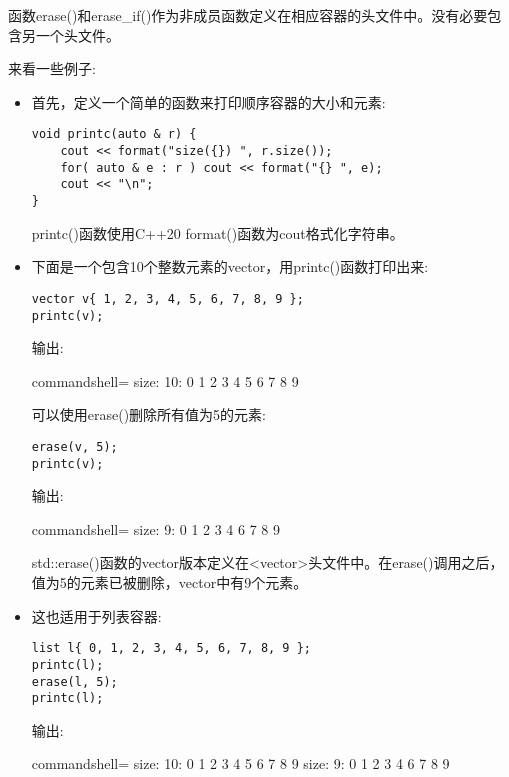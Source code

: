函数erase()和erase\_if()作为非成员函数定义在相应容器的头文件中。没有必要包含另一个头文件。

来看一些例子:

\begin{itemize}
\item 
首先，定义一个简单的函数来打印顺序容器的大小和元素:

\begin{lstlisting}[style=styleCXX]
void printc(auto & r) {
	cout << format("size({}) ", r.size());
	for( auto & e : r ) cout << format("{} ", e);
	cout << "\n";
}
\end{lstlisting}

printc()函数使用C++20 format()函数为cout格式化字符串。

\item 
下面是一个包含10个整数元素的vector，用printc()函数打印出来:

\begin{lstlisting}[style=styleCXX]
vector v{ 1, 2, 3, 4, 5, 6, 7, 8, 9 };
printc(v);
\end{lstlisting}

输出:

\begin{tcblisting}{commandshell={}}
size: 10: 0 1 2 3 4 5 6 7 8 9
\end{tcblisting}

可以使用erase()删除所有值为5的元素:

\begin{lstlisting}[style=styleCXX]
erase(v, 5);
printc(v);
\end{lstlisting}

输出:

\begin{tcblisting}{commandshell={}}
size: 9: 0 1 2 3 4 6 7 8 9
\end{tcblisting}

std::erase()函数的vector版本定义在<vector>头文件中。在erase()调用之后，值为5的元素已被删除，vector中有9个元素。

\item 
这也适用于列表容器:

\begin{lstlisting}[style=styleCXX]
list l{ 0, 1, 2, 3, 4, 5, 6, 7, 8, 9 };
printc(l);
erase(l, 5);
printc(l);
\end{lstlisting}

输出:

\begin{tcblisting}{commandshell={}}
size: 10: 0 1 2 3 4 5 6 7 8 9
size: 9: 0 1 2 3 4 6 7 8 9
\end{tcblisting}


\end{itemize}
